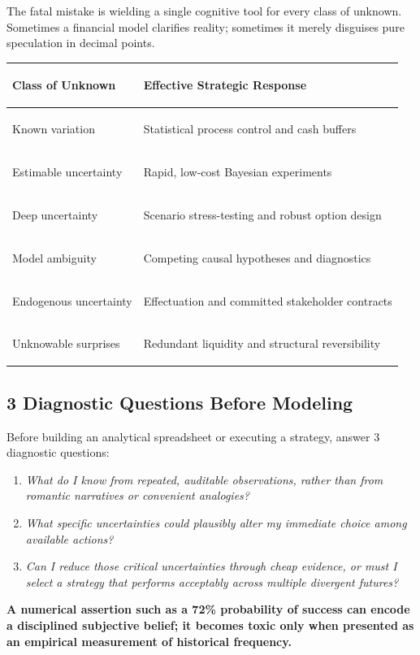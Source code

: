 The fatal mistake is wielding a single cognitive tool for every class of unknown. Sometimes a financial model clarifies reality; sometimes it merely disguises pure speculation in decimal points.

\begin{tcolorbox}[
  enhanced,
  colback=BayesSurface!60,
  colframe=BayesBorder,
  boxrule=0.5pt,
  arc=3pt,
  left=3pt,right=3pt,top=3pt,bottom=3pt,
  boxsep=1pt
]
\scriptsize
\begin{tabularx}{\linewidth}{>{\bfseries\raggedright\arraybackslash}p{2.3cm} X}
\toprule
\textbf{Class of Unknown} & \textbf{Effective Strategic Response} \\
\midrule
Known variation & Statistical process control and cash buffers \\
\addlinespace[2pt]
Estimable uncertainty & Rapid, low-cost Bayesian experiments \\
\addlinespace[2pt]
Deep uncertainty & Scenario stress-testing and robust option design \\
\addlinespace[2pt]
Model ambiguity & Competing causal hypotheses and diagnostics \\
\addlinespace[2pt]
Endogenous uncertainty & Effectuation and committed stakeholder contracts \\
\addlinespace[2pt]
Unknowable surprises & Redundant liquidity and structural reversibility \\
\bottomrule
\end{tabularx}
\end{tcolorbox}

\subsection{3 Diagnostic Questions Before Modeling}

Before building an analytical spreadsheet or executing a strategy, answer 3 diagnostic questions:

\begin{enumerate}[leftmargin=12pt,itemsep=2pt,topsep=1pt,parsep=0pt]
  \item \textit{What do I know from repeated, auditable observations, rather than from romantic narratives or convenient analogies?}
  \item \textit{What specific uncertainties could plausibly alter my immediate choice among available actions?}
  \item \textit{Can I reduce those critical uncertainties through cheap evidence, or must I select a strategy that performs acceptably across multiple divergent futures?}
\end{enumerate}

\textbf{A numerical assertion such as a 72\% probability of success can encode a disciplined subjective belief; it becomes toxic only when presented as an empirical measurement of historical frequency.}
